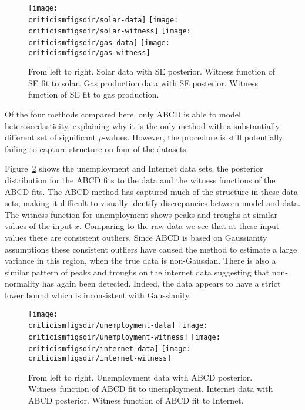 \begin{figure}[ht]
\centering
\texttt{[image: \\criticismfigsdir/solar-data]}
\texttt{[image: \\criticismfigsdir/solar-witness]}
\texttt{[image: \\criticismfigsdir/gas-data]}
\texttt{[image: \\criticismfigsdir/gas-witness]}
\caption[Fits and witness functions of Gaussian processes with SE kernels.]{
From left to right. Solar data with SE posterior. Witness function of SE fit to solar. Gas production data with SE posterior. Witness function of SE fit to gas production.
}
\label{fig:SE-witness}
\end{figure}

Of the four methods compared here, only ABCD is able to model heteroscedasticity, explaining why it is the only method with a substantially different set of significant $p$-values.
However, the procedure is still potentially failing to capture structure on four of the datasets.

Figure~\ref{fig:ABCD-witness} shows the unemployment and Internet data sets, the posterior distribution for the ABCD fits to the data and the witness functions of the ABCD fits.
The ABCD method has captured much of the structure in these data sets, making it difficult to visually identify discrepancies between model and data.
The witness function for unemployment shows peaks and troughs at similar values of the input $x$.
Comparing to the raw data we see that at these input values there are consistent outliers.
Since ABCD is based on Gaussianity assumptions these consistent outliers have caused the method to estimate a large variance in this region, when the true data is non-Gaussian.
There is also a similar pattern of peaks and troughs on the internet data suggesting that non-normality has again been detected.
Indeed, the data appears to have a strict lower bound which is inconsistent with Gaussianity.

\begin{figure}[ht]
\centering
\texttt{[image: \\criticismfigsdir/unemployment-data]}
\texttt{[image: \\criticismfigsdir/unemployment-witness]}
\texttt{[image: \\criticismfigsdir/internet-data]}
\texttt{[image: \\criticismfigsdir/internet-witness]}
\caption[Fits and witness functions of Gaussian processes with kernels built by ABCD.]{
From left to right. Unemployment data with ABCD posterior. Witness function of ABCD fit to unemployment. Internet data with ABCD posterior. Witness function of ABCD fit to Internet.
}
\label{fig:ABCD-witness}
\end{figure}

